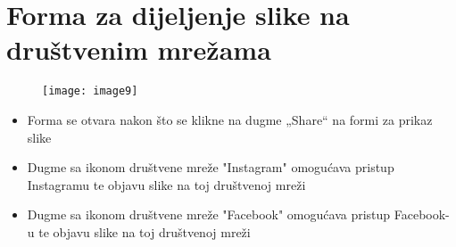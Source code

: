 \documentclass[12pt]{scrreprt}
\begin{document}
\section{Forma za dijeljenje slike na društvenim mrežama}

\begin{figure}[h]
	\begin{Center}
		\texttt{[image: image9]}
	\end{Center}
\end{figure}

\begin{itemize}
	\item	Forma se otvara nakon što se klikne na dugme „Share“ na formi za prikaz slike
	\item	Dugme sa ikonom društvene mreže "Instagram" omogućava pristup Instagramu te objavu slike na toj društvenoj mreži
	\item  Dugme sa ikonom društvene mreže "Facebook" omogućava pristup Facebook-u te objavu slike na toj društvenoj mreži
\end{itemize}
\end{document}
